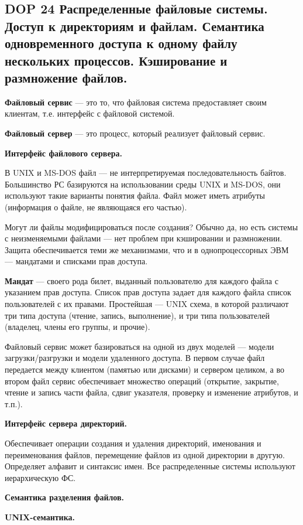 \subsection*{DOP 24 Распределенные файловые системы. Доступ к директориям и файлам. Семантика одновременного доступа к одному файлу нескольких процессов. Кэширование и размножение файлов.}

\textbf{Файловый сервис} --- это то, что файловая система предоставляет своим клиентам, т.е. интерфейс с файловой системой.

\textbf{Файловый сервер} --- это процесс, который реализует файловый сервис.

\textbf{Интерфейс файлового сервера.}

В UNIX и MS-DOS файл --- не интерпретируемая последовательность байтов.
Большинство РС базируются на использовании среды UNIX и MS-DOS, они используют такие варианты понятия файла.
Файл может иметь атрибуты (информация о файле, не являющаяся его частью).

Могут ли файлы модифицироваться после создания? Обычно да, но есть системы с неизменяемыми файлами --- нет проблем при кэшировании и размножении.
Защита обеспечивается теми же механизмами, что и в однопроцессорных ЭВМ --- мандатами и списками прав доступа.

\textbf{Мандат} --- своего рода билет, выданный пользователю для каждого файла с указанием прав доступа.
Список прав доступа задает для каждого файла список пользователей с их правами.
Простейшая --- UNIX схема, в которой различают три типа доступа (чтение, запись, выполнение), и три типа пользователей (владелец, члены его группы, и прочие).

Файловый сервис может базироваться на одной из двух моделей --- модели загрузки/разгрузки и модели удаленного доступа.
В первом случае файл передается между клиентом (памятью или дисками) и сервером целиком, а во втором файл сервис обеспечивает множество операций (открытие, закрытие, чтение и запись части файла, сдвиг указателя, проверку и изменение атрибутов, и т.п.).

\textbf{Интерфейс сервера директорий.}

Обеспечивает операции создания и удаления директорий, именования и переименования файлов, перемещение файлов из одной директории в другую.
Определяет алфавит и синтаксис имен.
Все распределенные системы используют иерархическую ФС.

\textbf{Семантика разделения файлов.}

\textbf{UNIX-семантика.}

